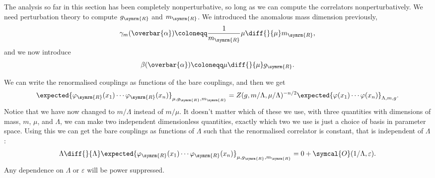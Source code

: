 \documentclass[fleqn]{NotesClass}
\newcommand{\order}{\symcal{O}}
\newcommand{\renormalised}{\symrm{R}}
\begin{document}
    The analysis so far in this section has been completely nonperturbative, so long as we can compute the correlators nonperturbatively.
    We need perturbation theory to compute \(g_{\renormalised}\) and \(m_{\renormalised}\).
    We introduced the anomalous mass dimension previously,
    \begin{equation}
        \gamma_{m}(\overbar{\alpha}) \coloneqq \frac{1}{m_{\renormalised}}  \mu \diff{}{\mu} m_{\renormalised},
    \end{equation}
    and we now introduce
    \begin{equation}
        \beta(\overbar{\alpha}) \coloneqq \mu \diff{}{\mu} g_{\renormalised}.
    \end{equation}
    
    We can write the renormalised couplings as functions of the bare couplings, and then we get
    \begin{equation}
        \expected{\varphi_{\renormalised}(x_1) \dotsm \varphi_{\renormalised}(x_n)}_{\mu, g_{\renormalised}, m_{\renormalised}} = Z(g, m/\Lambda, \mu/\Lambda)^{-n/2} \expected{\varphi(x_1) \dotsm \varphi(x_n)}_{\Lambda, m, g}.
    \end{equation}
    Notice that we have now changed to \(m/\Lambda\) instead of \(m/\mu\).
    It doesn't matter which of these we use, with three quantities with dimensions of mass, \(m\), \(\mu\), and \(\Lambda\), we can make two independent dimensionless quantities, exactly which two we use is just a choice of basis in parameter space.
    Using this we can get the bare couplings as functions of \(\Lambda\) such that the renormalised correlator is constant, that is independent of \(\Lambda\):
    \begin{equation}
        \Lambda \diff{}{\Lambda} \expected{\varphi_{\renormalised}(x_1) \dotsm \varphi_{\renormalised}(x_n)}_{\mu, g_{\renormalised}, m_{\renormalised}} = 0 + \order(1/\Lambda, \varepsilon).
    \end{equation}
    Any dependence on \(\Lambda\) or \(\varepsilon\) will be power suppressed.
    
\end{document}
